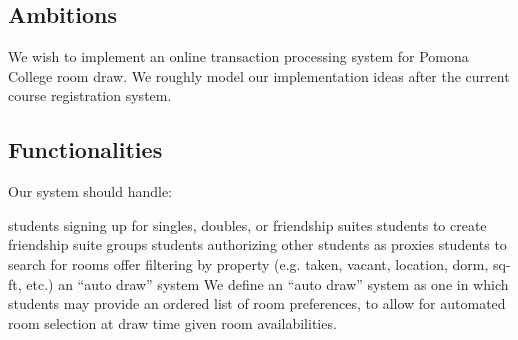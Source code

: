 \subsection{Ambitions}

We wish to implement an online transaction processing system for Pomona College
room draw. We roughly model our implementation ideas after the current course
registration system.

\subsection{Functionalities}

Our system should handle:

\begin{outline}
\1 students signing up for singles, doubles, or friendship suites
\1 students to create friendship suite groups
\1 students authorizing other students as proxies
\1 students to search for rooms
    \2 offer filtering by property (e.g. taken, vacant, location, dorm, sq-ft,
    etc.)
\1 an ``auto draw'' system
    \2 We define an ``auto draw'' system as one in which students may provide an
    ordered list of room preferences, to allow for automated room selection at
    draw time given room availabilities.
\end{outline}